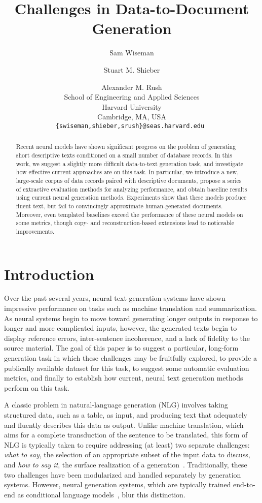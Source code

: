 \documentclass[11pt,letterpaper]{article}
\title{Challenges in Data-to-Document Generation}
\author{Sam Wiseman \and Stuart M. Shieber \and Alexander M. Rush \\
         School of Engineering and Applied Sciences \\ Harvard University \\ Cambridge, MA, USA \\ {\tt \{swiseman,shieber,srush\}@seas.harvard.edu }}
\date{}
\begin{document}
\maketitle

\begin{abstract}

  Recent neural models have shown significant progress on the problem of
  generating short descriptive texts conditioned on a small number of database records. In this work, we 
  suggest a slightly more difficult data-to-text generation task, and investigate how effective current approaches are on this task. In particular, we introduce a
  new, large-scale corpus of data records paired with descriptive
  documents, propose a series of extractive evaluation methods for
  analyzing performance, and obtain baseline results using current neural generation methods. Experiments show that these models produce
  fluent text, but fail to convincingly approximate human-generated documents. Moreover, even templated baselines exceed the performance of these neural models on some metrics, though copy- and reconstruction-based extensions lead to noticeable
  improvements. 
\end{abstract}

\section{Introduction}
Over the past several years, neural text generation systems have shown impressive performance on tasks such as machine translation and summarization. As neural systems begin to move toward generating longer outputs in response to longer and more complicated inputs, however, the generated texts begin to display reference errors, inter-sentence incoherence, and a lack of fidelity to the source material. The goal of this paper is to suggest a particular, long-form generation task in which these challenges may be fruitfully explored, to provide a publically available dataset for this task, to suggest some automatic evaluation metrics, and finally to establish how current, neural text generation methods perform on this task.

A classic problem in natural-language generation (NLG)
\cite{kukich1983design,mckeown1992text,reiter1997building} involves taking
structured data, such as a table, as input, and producing text that adequately and fluently describes this data as output. Unlike machine translation, which aims for a
complete transduction of the sentence to be translated, this form of NLG is typically taken to require addressing (at least) two separate challenges: \textit{what to say}, the selection of an appropriate subset of the input data to discuss, and \textit{how to say it}, the surface realization of a generation~\citep{reiter1997building,jurafsky2014speech}. Traditionally, these two challenges have been 
modularized and handled separately by generation systems. However, neural generation systems, which are typically trained end-to-end as conditional language models~\cite{mikolov-2010,sutskever2011generating,sutskever2014sequence}, blur this distinction. 
\end{document}
